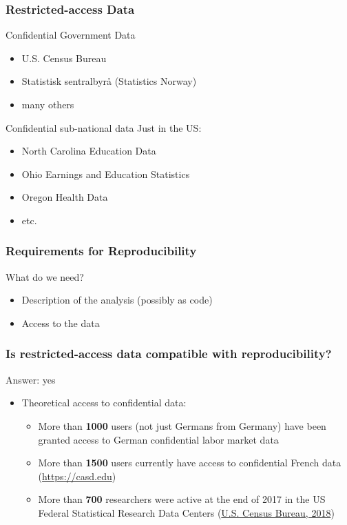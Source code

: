 \begin{frame}
\frametitle{Restricted-access Data}
\begin{block}{Confidential Government Data}
	\begin{itemize}
		\item U.S. Census Bureau
		\item Statistisk sentralbyrå (Statistics Norway)
		\item many others
	\end{itemize}
\end{block}

\begin{block}{Confidential sub-national data}
	Just in the US:
	\begin{itemize}
		\item North Carolina Education Data
		\item Ohio Earnings and Education Statistics
		\item Oregon Health Data
		\item etc.
	\end{itemize}
\end{block}
\end{frame}



\begin{frame}
\frametitle{Requirements for Reproducibility}
\begin{block}{What do we need?}
\begin{itemize}
	\item Description of the analysis (possibly as code)
	\item Access to the data
\end{itemize}
\end{block}
\end{frame}



\begin{frame}
\frametitle{Is restricted-access data compatible with reproducibility?}
\pause
\begin{block}{Answer: yes}
	\pause
\begin{itemize}
	\item Theoretical access to confidential  data: 
	\begin{itemize}
		\item More than \textbf{1000} users (not just Germans from Germany) have been granted access to German confidential labor market data   
		\item More than \textbf{1500} users currently have access to confidential French data (\url{https://casd.edu})
		\item More than \textbf{700} researchers were active at the end of 2017 in the US Federal Statistical Research Data Centers (\href{https://www.census.gov/ces/pdf/2017_CES_Research_Report.pdf}{U.S. Census Bureau, 2018})
	\end{itemize}
\end{itemize}
\end{block}
\end{frame}

